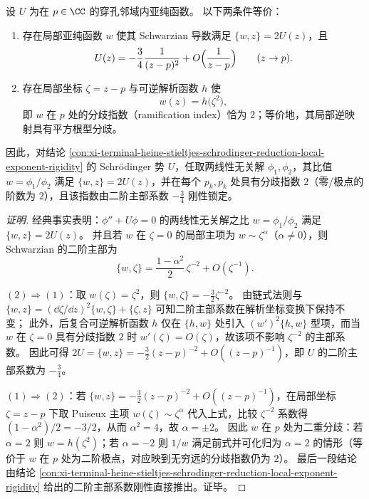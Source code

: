 \begin{conclusion}\label{con:xi-terminal-schwarzian-rigidity-branch-index-2}
设 \(U\) 为在 \(p\in\CC\) 的穿孔邻域内亚纯函数。
以下两条件等价：
\begin{enumerate}
  \item 存在局部亚纯函数 \(w\) 使其 Schwarzian 导数满足 \(\{w,z\}=2U(z)\)，且
  \[
  U(z)=-\frac34\frac{1}{(z-p)^2}+O\Bigl(\frac{1}{z-p}\Bigr)\qquad(z\to p).
  \]
  \item 存在局部坐标 \(\zeta=z-p\) 与可逆解析函数 \(h\) 使
  \[
  w(z)=h\bigl(\zeta^{2}\bigr),
  \]
  即 \(w\) 在 \(p\) 处的分歧指数（ramification index）恰为 \(2\)；等价地，其局部逆映射具有平方根型分歧。
\end{enumerate}
因此，对结论 \ref{con:xi-terminal-heine-stieltjes-schrodinger-reduction-local-exponent-rigidity} 的 Schr\"odinger 势 \(U\)，任取两线性无关解 \(\phi_1,\phi_2\)，其比值 \(w=\phi_1/\phi_2\) 满足 \(\{w,z\}=2U(z)\)，并在每个 \(p_k,\overline{p_k}\) 处具有分歧指数 \(2\)（零/极点的阶数为 \(2\)），且该指数由二阶主部系数 \(-\tfrac34\) 刚性锁定。
\end{conclusion}
\begin{proof}[证明]
经典事实表明：\(\phi''+U\phi=0\) 的两线性无关解之比 \(w=\phi_1/\phi_2\) 满足 \(\{w,z\}=2U(z)\)。
并且若 \(w\) 在 \(\zeta=0\) 的局部主项为 \(w\sim \zeta^{\alpha}\)（\(\alpha\neq 0\)），则 Schwarzian 的二阶主部为
\[
\{w,\zeta\}=\frac{1-\alpha^{2}}{2}\,\zeta^{-2}+O(\zeta^{-1}).
\]
\par
\((2)\Rightarrow(1)\)：取 \(w(\zeta)=\zeta^{2}\)，则 \(\{w,\zeta\}=-\tfrac{3}{2}\zeta^{-2}\)。
由链式法则与 \(\{w,z\}=(\dd\zeta/\dd z)^2\{w,\zeta\}+\{\zeta,z\}\) 可知二阶主部系数在解析坐标变换下保持不变；
此外，后复合可逆解析函数 \(h\) 仅在 \(\{h,w\}\) 处引入 \((w')^{2}\{h,w\}\) 型项，而当 \(w\) 在 \(\zeta=0\) 具有分歧指数 \(2\) 时 \(w'(\zeta)=O(\zeta)\)，故该项不影响 \(\zeta^{-2}\) 的主部系数。
因此可得 \(2U=\{w,z\}=-\tfrac{3}{2}(z-p)^{-2}+O((z-p)^{-1})\)，即 \(U\) 的二阶主部系数为 \(-\tfrac34\)。
\par
\((1)\Rightarrow(2)\)：若 \(\{w,z\}=-\tfrac{3}{2}(z-p)^{-2}+O((z-p)^{-1})\)，在局部坐标 \(\zeta=z-p\) 下取 Puiseux 主项 \(w(\zeta)\sim \zeta^{\alpha}\) 代入上式，比较 \(\zeta^{-2}\) 系数得 \((1-\alpha^{2})/2=-3/2\)，从而 \(\alpha^{2}=4\)，故 \(\alpha=\pm 2\)。
因此 \(w\) 在 \(p\) 处为二重分歧：若 \(\alpha=2\) 则 \(w=h(\zeta^{2})\)；若 \(\alpha=-2\) 则 \(1/w\) 满足前式并可化归为 \(\alpha=2\) 的情形（等价于 \(w\) 在 \(p\) 处为二阶极点，对应映到无穷远的分歧指数仍为 \(2\)）。
最后一段结论由结论 \ref{con:xi-terminal-heine-stieltjes-schrodinger-reduction-local-exponent-rigidity} 给出的二阶主部系数刚性直接推出。证毕。
\end{proof}

